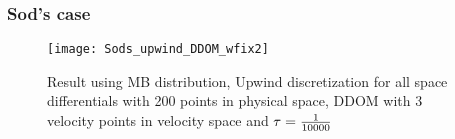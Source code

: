 \begin{frame}
	\frametitle{Sod's case}
		
		\begin{figure}
			\centering
				\texttt{[image: Sods\_upwind\_DDOM\_wfix2]}
			\caption{Result using MB distribution, Upwind discretization for all space differentials with 200 points in physical space, DDOM with 3 velocity points in velocity space and $\tau = {1 \over 10000}$}
			\label{fig:MB_Sods_DDOM_wfix2}
		\end{figure}
		
\end{frame}